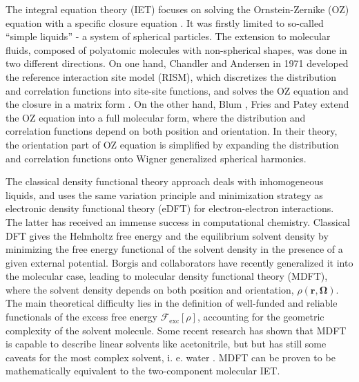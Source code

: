 The integral equation theory (\acs{IET}) focuses on solving the Ornstein-Zernike
(\acs{OZ}) equation with a specific closure equation \citep{Hensen-McDonald,Gray-Gubbins}.
It was firstly limited to so-called ``simple liquids'' - a system
of spherical particles. The extension to molecular fluids, composed
of polyatomic molecules with non-spherical shapes, was done in two
different directions. On one hand, Chandler and Andersen in 1971 \citep{Chandler_1972_RISM}
developed the reference interaction site model (\acs{RISM}), which
discretizes the distribution and correlation functions into site-site
functions, and solves the \acs{OZ} equation and the closure in a
matrix form \citep{hirata_molecular_2004}. On the other hand, Blum
\citep{Blum_I,Blum_II}, Fries and Patey \citep{Fries_Patey_1985}
extend the \acs{OZ} equation into a full molecular form, where the
distribution and correlation functions depend on both position and
orientation. In their theory, the orientation part of \acs{OZ} equation
is simplified by expanding the distribution and correlation functions
onto Wigner generalized spherical harmonics.

The classical density functional theory approach deals with inhomogeneous
liquids, and uses the same variation principle and minimization strategy
\citep{mermin_thermal_1965,Evans_1979,Hansen_1987} as electronic
density functional theory (e\acs{DFT}) for electron-electron interactions.
The latter has received an immense success in computational chemistry.
Classical \acs{DFT} gives the Helmholtz free energy and the equilibrium
solvent density by minimizing the free energy functional of the solvent
density in the presence of a given external potential. Borgis and
collaborators \citep{gendre_classical_2009,jeanmairet_molecular_2013-1,jeanmairet_molecular_2015,jeanmairet_molecular_2016,Jeanmairet_thesis,levesque_solvation_2012,ramirez_density_2002,ramirez_density_2005,sergiievskyi_fast_2014,Zhao_2011}
have recently generalized it into the molecular case, leading to molecular
density functional theory (\acs{MDFT}), where the solvent density
depends on both position and orientation, $\rho(\mathbf{r},\mathbf{\Omega})$.
The main theoretical difficulty lies in the definition of well-funded
and reliable functionals of the excess free energy $\mathcal{F}_{\mathrm{exc}}\left[\rho\right]$,
accounting for the geometric complexity of the solvent molecule. Some
recent research has shown that \acs{MDFT} is capable to describe
linear solvents like acetonitrile, but but has still some caveats
for the most complex solvent, i. e. water \citep{Zhao_2011}. \acs{MDFT}
can be proven to be mathematically equivalent to the two-component
molecular \acs{IET}.

